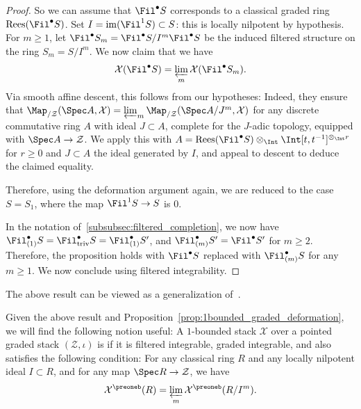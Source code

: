 \documentclass[10pt]{amsart}
\begin{document}
\begin{proof}
So we can assume that $\Fil^\bullet S$ corresponds to a classical graded ring $\mathrm{Rees}(\Fil^\bullet S)$. Set $I = \mathrm{im}(\Fil^1S)\subset S$: this is locally nilpotent by hypothesis. For $m\ge 1$, let $\Fil^\bullet S_m = \Fil^\bullet S/I^m\Fil^\bullet S$ be the induced filtered structure on the ring $S_m = S/I^m$. We now claim that we have
\[
\mathcal{X}(\Fil^\bullet S) = \varprojlim_m \mathcal{X}(\Fil^\bullet S_m).
\]
Via smooth affine descent, this follows from our hypotheses: Indeed, they ensure that $\Map_{/\mathcal{Z}}(\Spec A,\mathcal{X}) = \varprojlim_m \Map_{/\mathcal{Z}}(\Spec A/J^m,\mathcal{X})$ for any discrete commutative ring $A$ with ideal $J\subset A$, complete for the $J$-adic topology, equipped with $\Spec A\to \mathcal{Z}$. We apply this with $A = \mathrm{Rees}(\Fil^\bullet S)\otimes_{\Int}\Int[t,t^{-1}]^{\otimes_{\Int} r}$ for $r\ge 0$ and $J\subset A$ the ideal generated by $I$, and appeal to descent to deduce the claimed equality.


Therefore, using the deformation argument again, we are reduced to the case $S = S_1$, where the map $\Fil^1S\to S$ is $0$. 

In the notation of~\eqref{subsubsec:filtered_completion}, we now have $\Fil^\bullet_{(1)}S = \Fil^\bullet_{\mathrm{triv}}S = \Fil^\bullet_{(1)}S'$, and $\Fil^\bullet_{(m)}S' = \Fil^\bullet S'$ for $m\ge 2$. Therefore, the proposition holds with $\Fil^\bullet S$ replaced with $\Fil^\bullet_{(m)}S$ for any $m\ge 1$. We now conclude using filtered integrability.
\end{proof}

\begin{remark}
The above result can be viewed as a generalization of~\cite[Remark 6.3.3]{MR4355476}.
\end{remark}
 

\begin{definition}
\label{defn:strongly_integrable}
Given the above result and Proposition~\ref{prop:1bounded_graded_deformation}, we will find the following notion useful: A $1$-bounded stack $\mathcal{X}$ over a pointed graded stack $(\mathcal{Z},\iota)$ is  if it is filtered integrable, graded integrable, and also satisfies the following condition: For any classical ring $R$ and any locally nilpotent ideal $I\subset R$, and for any map $\Spec R \to \mathcal{Z}$, we have
\[
  \mathcal{X}^\preoneb(R) = \varprojlim_m \mathcal{X}^\preoneb(R/I^m).
\]
\end{definition}  
\end{document}
